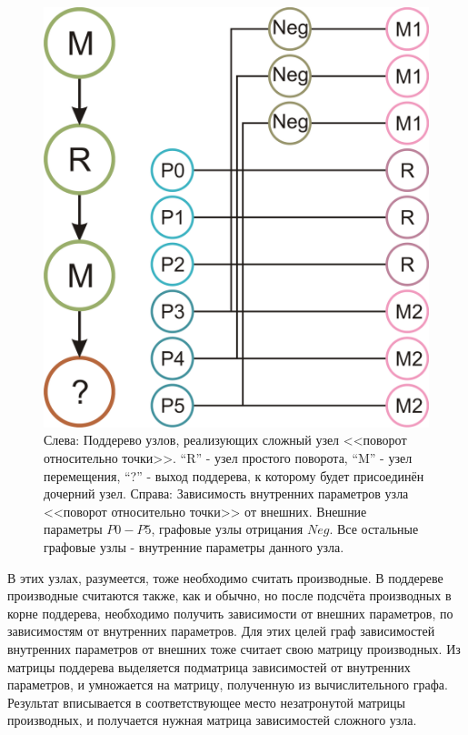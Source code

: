 \documentclass[a4paper,hidelinks,12pt]{article}
\begin{document}
\begin{figure}[H]
\begin{center}
	\includegraphics[width=11 cm]{graphs_crot.png}
	\caption{Слева: Поддерево узлов, реализующих сложный узел <<поворот относительно точки>>. ``R'' - узел простого поворота, ``M'' - узел перемещения, ``?'' - выход поддерева, к которому будет присоединён дочерний узел. Справа: Зависимость внутренних параметров узла <<поворот относительно точки>> от внешних. Внешние параметры $P0-P5$, графовые узлы отрицания $Neg$. Все остальные графовые узлы - внутренние параметры данного узла.}
 	\label{fig_crot}
\end{center}
\end{figure}

\par
В этих узлах, разумеется, тоже необходимо считать производные. В поддереве производные считаются также, как и обычно, но после подсчёта производных в корне поддерева, необходимо получить зависимости от внешних параметров, по зависимостям от внутренних параметров. Для этих целей граф зависимостей внутренних параметров от внешних тоже считает свою матрицу производных. Из матрицы поддерева выделяется подматрица зависимостей от внутренних параметров, и умножается на матрицу, полученную из вычислительного графа. Результат вписывается в соответствующее место незатронутой матрицы производных, и получается нужная матрица зависимостей сложного узла.
\end{document}
